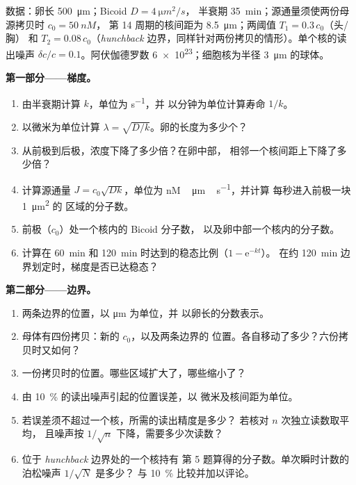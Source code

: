\begin{problem}
\label{pb:b3:developmental-genetics:1}
数据：卵长 \qty{500}{\micro m}；Bicoid $D = \qty{4}{\micro m^2/s}$，
半衰期 \qty{35}{min}；源通量须使两份母源拷贝时 $c_{0} = \qty{50}{nM}$，
第 14 周期的核间距为 \qty{8.5}{\micro m}；两阈值 $T_{1} = 0.3\,c_{0}$（头/胸）
和 $T_{2} =
0.08\,c_{0}$（\emph{hunchback} 边界，同样针对两份拷贝的情形）。单个核的读出噪声
$\delta c/c = 0.1$。阿伏伽德罗数
\qty{6e23}{}；细胞核为半径 \qty{3}{\micro m} 的球体。

\medskip
\noindent\textbf{第一部分——梯度。}
\begin{enumerate}
  \item 由半衰期计算 $k$，单位为 \unit{s^{-1}}，并
        以分钟为单位计算寿命 $1/k$。
  \item 以微米为单位计算 $\lambda = \sqrt{D/k}$。卵的长度为多少个？
  \item 从前极到后极，浓度下降了多少倍？在卵中部，
        相邻一个核间距上下降了多少倍？
  \item 计算源通量 $J = c_{0}\sqrt{Dk}$，单位为
        \unit{nM\,\micro m\,s^{-1}}，并计算
        每秒进入前极一块 \qty{1}{\micro m^2} 的
        区域的分子数。
  \item 前极（$c_{0}$）处一个核内的 Bicoid 分子数，
        以及卵中部一个核内的分子数。
  \item 计算在 \qty{60}{min} 和
        \qty{120}{min} 时达到的稳态比例（$1 - \mathrm{e}^{-kt}$）。
        在约 \qty{120}{min} 边界划定时，梯度是否已达稳态？
\end{enumerate}

\medskip
\noindent\textbf{第二部分——边界。}
\begin{enumerate}[resume]
  \item 两条边界的位置，以 \unit{\micro m} 为单位，并
        以卵长的分数表示。
  \item 母体有四份拷贝：新的 $c_{0}$，以及两条边界的
        位置。各自移动了多少？六份拷贝时又如何？
  \item 一份拷贝时的位置。哪些区域扩大了，哪些缩小了？
  \item 由 \qty{10}{\%} 的读出噪声引起的位置误差，以
        微米及核间距为单位。
  \item 若误差须不超过一个核，所需的读出精度是多少？
        若核对 $n$ 次独立读数取平均，
        且噪声按 $1/\sqrt{n}$ 下降，需要多少次读数？
  \item 位于 \emph{hunchback} 边界处的一个核持有
        第 5 题算得的分子数。单次瞬时计数的泊松噪声
        $1/\sqrt{N}$ 是多少？
        与 \qty{10}{\%} 比较并加以评论。
\end{enumerate}


\end{problem}
